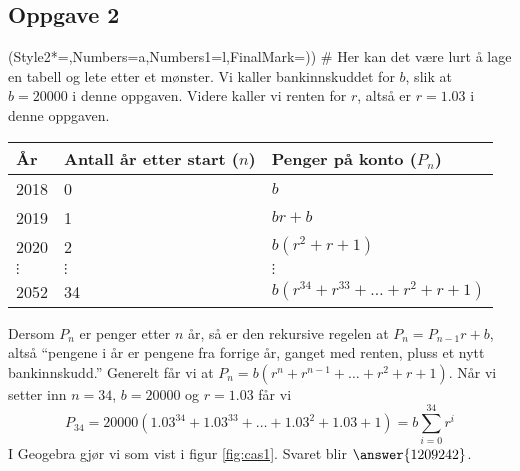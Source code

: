 \subsection*{Oppgave 2}
\begin{easylist}[enumerate]
	\ListProperties(Style2*=,Numbers=a,Numbers1=l,FinalMark={)})
	# Her kan det være lurt å lage en tabell og lete etter et mønster.
	Vi kaller bankinnskuddet for $b$, slik at $b = 20000$ i denne oppgaven.
	Videre kaller vi renten for $r$, altså er $r = 1.03$ i denne oppgaven.
	\begin{center}
		\begin{tabular}{lll}
			\textbf{År} & \textbf{Antall år etter start} ($n$) & \textbf{Penger på konto} ($P_n$) \\ \hline
			2018 & 0 & $b$ \\
			2019 & 1 & $br + b$ \\
			2020 & 2 & $b(r^2 + r + 1)$ \\
			$\vdots$ & $\vdots$ & $\vdots$ \\
			2052 & 34 & $b \left(r^{34} + r^{33} + \dots + r^2 + r + 1\right)$
		\end{tabular}
	\end{center}
	

	Dersom $P_n$ er penger etter $n$ år, så er den rekursive regelen
	at $P_n = P_{n-1}r + b$, altså ``pengene i år er pengene fra forrige år, ganget med renten, pluss et nytt bankinnskudd.''
	Generelt får vi at $P_n = b \left(r^{n} + r^{n-1} + \dots + r^2 + r + 1\right)$.
	Når vi setter inn $n = 34$, $b = 20000$ og $r = 1.03$ får vi
	\begin{equation*}
		P_{34} = 20000 \left(1.03^{34} + 1.03^{33} + \dots + 1.03^2 + 1.03 + 1\right) = b \sum_{i=0}^{34} r^i
	\end{equation*}
	I Geogebra gjør vi som vist i figur \ref{fig:cas1}. Svaret blir $\answer{1209242}$.
	

\end{easylist}
